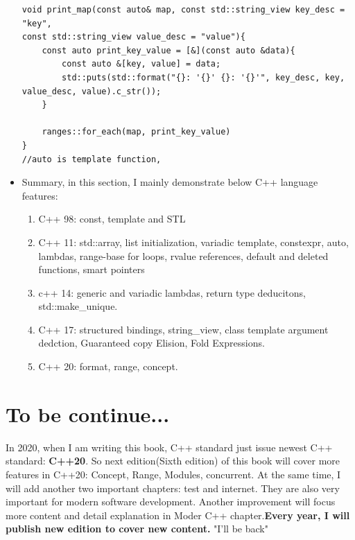 \documentclass[a4paper,11pt,twoside]{book}
\begin{document}
\begin{itemize}
\begin{lstlisting}
void print_map(const auto& map, const std::string_view key_desc = "key",
const std::string_view value_desc = "value"){
	const auto print_key_value = [&](const auto &data){
		const auto &[key, value] = data;
		std::puts(std::format("{}: '{}' {}: '{}'", key_desc, key, value_desc, value).c_str());
	}
	
	ranges::for_each(map, print_key_value)		   
}	
//auto is template function, 
\end{lstlisting}	

    \item Summary, in this section, I mainly demonstrate below C++ language features:

\begin{enumerate}
    \item C++ 98: const, template and STL
    \item C++ 11: std::array, list initialization, variadic template, constexpr, auto, lambdas, range-base for loops, rvalue references, default and deleted functions, smart pointers
    \item c++ 14: generic and variadic lambdas, return type deducitons, std::make\_unique.
    \item C++ 17: structured bindings, string\_view, class template argument dedction, Guaranteed copy Elision, Fold Expressions.
    \item C++ 20: format, range, concept. 
\end{enumerate}

\end{itemize}

\section{To be continue...}
In 2020, when I am writing this book,  C++ standard just issue newest C++ standard: \textbf{C++20}. So next edition(Sixth edition) of this book will cover more features in C++20: Concept, Range, Modules, concurrent. At the same time, I will add another two important chapters: test and internet. They are also very important for modern software development. Another improvement will focus more content and detail explanation in Moder C++ chapter.\textbf{Every year, I will publish new edition to cover new content.} 
\newline
"I'll be back"


\end{document}
